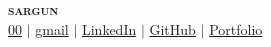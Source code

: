\begin{center} 
 \textbf{\Huge \scshape sargun} \\ \vspace{3pt} 
 \small 
 \faMobile \hspace{.5pt} \href{tel:00}{00} 
 $|$ 
 \faAt \hspace{.5pt} \href{mailto:gmail}{gmail} 
 $|$ 
 \faLinkedinSquare \hspace{.5pt} \href{google}{LinkedIn} 
 $|$ 
 \faGithub \hspace{.5pt} \href{google}{GitHub} 
 $|$ 
 \faGlobe \hspace{.5pt} \href{google}{Portfolio} 
 \end{center}
